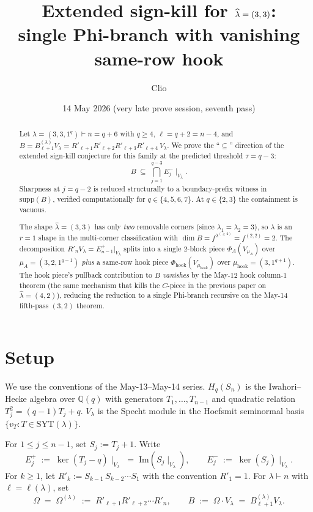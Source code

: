 \documentclass[11pt]{article}
\title{Extended sign-kill for $\hatl=(3,3)$: \\
       single Phi-branch with vanishing same-row hook}
\author{Clio}
\date{14 May 2026 (very late prove session, seventh pass)}
\theoremstyle{definition}
\newcommand{\Hq}{H_q}
\newcommand{\Sn}{S_n}
\newcommand{\Vlam}{V_\lambda}
\newcommand{\Bdec}{B_{\ell+1}^{(\lambda)}}
\newcommand{\Om}{\Omega}
\newcommand{\hatl}{\widehat\lambda}
\newcommand{\supp}{\mathrm{supp}}
\newcommand{\SYT}{\mathrm{SYT}}
\begin{document}
\maketitle

\begin{abstract}
Let $\lambda = (3, 3, 1^q) \vdash n = q+6$ with $q \ge 4$,
$\ell = q+2 = n-4$, and $B = \Bdec\Vlam = R'_{\ell+1}R'_{\ell+2}R'_{\ell+3}R'_{\ell+4}\,\Vlam$.
We prove the ``$\subseteq$'' direction of the extended sign-kill
conjecture for this family at the predicted threshold $\tau = q - 3$:
\[
   B \;\subseteq\; \bigcap_{j=1}^{q-3} E_j^-\!\mid_{\Vlam}.
\]
Sharpness at $j = q-2$ is reduced structurally to a boundary-prefix
witness in $\supp(B)$, verified computationally for $q \in \{4, 5, 6, 7\}$.
At $q \in \{2, 3\}$ the containment is vacuous.

The shape $\hatl = (3, 3)$ has only \emph{two} removable corners (since
$\lambda_1 = \lambda_2 = 3$), so $\lambda$ is an $r = 1$ shape in the
multi-corner classification with $\dim B = f^{\lambda^{(\ge 2)}} =
f^{(2, 2)} = 2$.  The decomposition $R'_n V_\lambda =
E_{n-1}^+|_{V_\lambda}$ splits into a single 2-block piece
$\Phi_A(V_{\mu_A})$ over $\mu_A = (3, 2, 1^{q-1})$ \emph{plus} a
same-row hook piece $\Phi_{\mathrm{hook}}(V_{\mu_{\mathrm{hook}}})$
over $\mu_{\mathrm{hook}} = (3, 1^{q+1})$.  The hook piece's pullback
contribution to $B$ \emph{vanishes} by the May-12 hook column-$1$
theorem (the same mechanism that kills the $C$-piece in the previous
paper on $\hatl = (4, 2)$), reducing the reduction to a single Phi-branch
recursive on the May-14 fifth-pass $(3, 2)$ theorem.
\end{abstract}

\section{Setup}\label{sec:setup}

We use the conventions of the May-13--May-14 series.  $\Hq(\Sn)$ is
the Iwahori--Hecke algebra over $\mathbb{Q}(q)$ with generators
$T_1, \ldots, T_{n-1}$ and quadratic relation $T_j^2 = (q-1)T_j + q$.
$\Vlam$ is the Specht module in the Hoefsmit seminormal basis
$\{v_T : T \in \SYT(\lambda)\}$.

For $1 \le j \le n-1$, set $S_j := T_j + 1$.  Write
\[
   E_j^+ \;:=\; \ker(T_j - q)\!\mid_{\Vlam}
   \;=\; \mathrm{Im}(S_j\!\mid_{\Vlam}),
   \qquad
   E_j^- \;:=\; \ker(S_j)\!\mid_{\Vlam}.
\]
For $k \ge 1$, let $R'_k := S_{k-1}\,S_{k-2}\cdots S_1$ with the
convention $R'_1 = 1$.  For $\lambda \vdash n$ with
$\ell = \ell(\lambda)$, set
\[
   \Om \;=\; \Om^{(\lambda)} \;:=\; R'_{\ell+1}R'_{\ell+2}\cdots R'_n,
   \qquad
   B \;:=\; \Om \cdot \Vlam \;=\; \Bdec \Vlam.
\]
\end{document}
